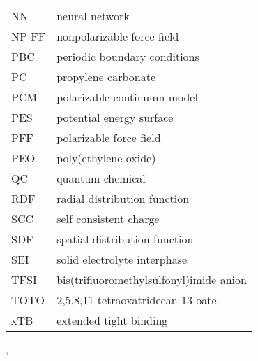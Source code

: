 \begin{longtable}{ll}
    NN & neural network \\
    NP-FF & nonpolarizable force field \\
    PBC & periodic boundary conditions \\
    PC & propylene carbonate \\    
    PCM & polarizable continuum model \\
    PES & potential energy surface \\
    PFF & polarizable force field \\
    PEO & poly(ethylene oxide) \\
    QC & quantum chemical \\
    RDF & radial distribution function \\
    SCC & self consistent charge \\
    SDF & spatial distribution function \\
    SEI & solid electrolyte interphase \\
    TFSI & bis(trifluoromethylsulfonyl)imide anion\\
    TOTO & 2,5,8,11-tetraoxatridecan-13-oate \\
    xTB & extended tight binding \\
\end{longtable}

{\color{white}
\cite{li-na-continuation},
\cite{homo-lumo}
}